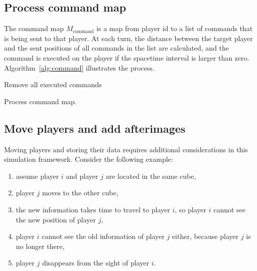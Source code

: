 \documentclass{svproc}
\begin{document}
\subsection{Process command map} \label{ssec:command}

The command map $M_{\textrm{command}}$ is a map from player id to a list of commands that is being sent to that player.
At each turn, the distance between the target player and the sent positions of all commands in the list are calculated,
and the command is executed on the player if the spacetime interval is larger than zero.
Algorithm~\ref{alg:command} illustrates the process.

\begin{algorithm}

Remove all executed commands\;

\caption{Process command map.}
\label{alg:command}
\end{algorithm}

\subsection{Move players and add afterimages} \label{ssec:move}

Moving players and storing their data requires additional considerations in this simulation framework.
Consider the following example:
\begin{enumerate}
  \item assume player $i$ and player $j$ are located in the same cube,
  \item player $j$ moves to the other cube,
  \item the new information takes time to travel to player $i$, so player $i$ cannot see the new position of player $j$,
  \item player $i$ cannot see the old information of player $j$ either, because player $j$ is no longer there,
  \item player $j$ disappears from the sight of player $i$.
\end{enumerate}
\end{document}
